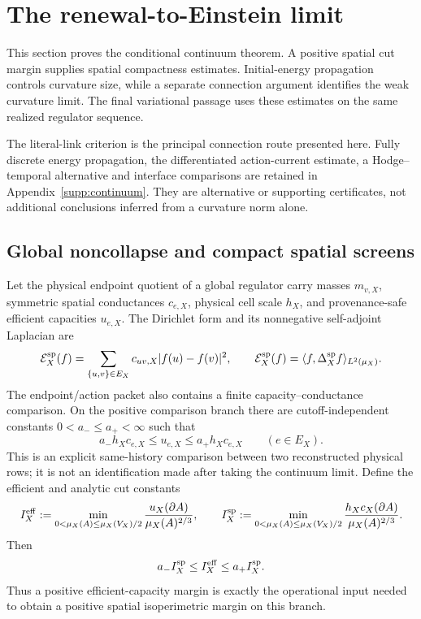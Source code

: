 \documentclass[11pt]{article}
\numberwithin{equation}{section}
\theoremstyle{definition}
\theoremstyle{remark}
\begin{document}
\section{The renewal-to-Einstein limit}
\label{sec:einstein-limit}

This section proves the conditional continuum theorem. A positive spatial
cut margin supplies spatial compactness estimates. Initial-energy propagation
controls curvature size, while a separate connection argument identifies
the weak curvature limit. The final variational passage uses these estimates
on the same realized regulator sequence.

The literal-link criterion is the principal connection route presented
here. Fully discrete energy propagation, the differentiated action-current
estimate, a Hodge--temporal alternative and interface comparisons are
retained in Appendix~\ref{supp:continuum}. They are alternative or supporting
certificates, not additional conclusions inferred from a curvature norm alone.
\subsection{Global noncollapse and compact spatial screens}

Let the physical endpoint quotient of a global regulator carry masses
$m_{v,X}$, symmetric spatial conductances $c_{e,X}$, physical cell scale
$h_X$, and provenance-safe efficient capacities $u_{e,X}$.  The Dirichlet
form and its nonnegative self-adjoint Laplacian are
\begin{equation}
 \mathcal E_X^{\rm sp}(f)
 =\sum_{\{u,v\}\in E_X}c_{uv,X}|f(u)-f(v)|^2,
 \qquad
 \mathcal E_X^{\rm sp}(f)=\langle f,\Delta_X^{\rm sp}f\rangle_{L^2(\mu_X)}.
 \label{eq:main-spatial-dirichlet}
\end{equation}
The endpoint/action packet also contains a finite capacity--conductance
comparison.  On the positive comparison branch there are cutoff-independent
constants $0<a_-\le a_+<\infty$ such that
\begin{equation}
 a_-h_Xc_{e,X}\le u_{e,X}\le a_+h_Xc_{e,X}
 \qquad(e\in E_X).
 \label{eq:main-capacity-conductance}
\end{equation}
This is an explicit same-history comparison between two reconstructed physical
rows; it is not an identification made after taking the continuum limit.
Define the efficient and analytic cut constants
\begin{equation}
 I_X^{\rm eff}:=
 \min_{0<\mu_X(A)\le\mu_X(V_X)/2}
 \frac{u_X(\partial A)}{\mu_X(A)^{2/3}},
 \qquad
 I_X^{\rm sp}:=
 \min_{0<\mu_X(A)\le\mu_X(V_X)/2}
 \frac{h_Xc_X(\partial A)}{\mu_X(A)^{2/3}}.
 \label{eq:main-cut-constant}
\end{equation}
Then
\begin{equation}
 a_- I_X^{\rm sp}\le I_X^{\rm eff}\le a_+I_X^{\rm sp}.
 \label{eq:main-cut-comparison}
\end{equation}
Thus a positive efficient-capacity margin is exactly the operational input
needed to obtain a positive spatial isoperimetric margin on this branch.
\end{document}
